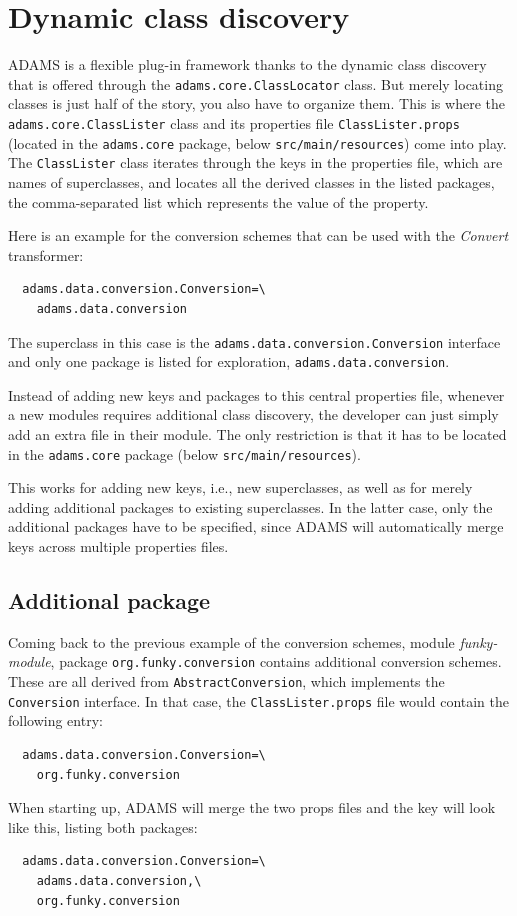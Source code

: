 \section{Dynamic class discovery}
\label{dynamic_class_discovery}
ADAMS is a flexible plug-in framework thanks to the dynamic class discovery that
is offered through the \texttt{adams.core.ClassLocator} class. But merely
locating classes is just half of the story, you also have to organize them. This
is where the \texttt{adams.core.ClassLister} class and its properties file
\texttt{ClassLister.props} (located in the \texttt{adams.core} package, below
\texttt{src/main/resources}) come into play. The \texttt{ClassLister} class
iterates through the keys in the properties file, which are names of
superclasses, and locates all the derived classes in the listed packages, the
comma-separated list which represents the value of the property.

Here is an example for the conversion schemes that can be used with the
\textit{Convert} transformer:
\begin{verbatim}
  adams.data.conversion.Conversion=\
    adams.data.conversion
\end{verbatim}
The superclass in this case is the
\texttt{adams.data.conversion.Conversion} interface and only one package is listed
for exploration, \texttt{adams.data.conversion}.

Instead of adding new keys and packages to this central properties file,
whenever a new modules requires additional class discovery, the developer can
just simply add an extra file in their module. The only restriction is that it
has to be located in the \texttt{adams.core} package (below
\texttt{src/main/resources}).

This works for adding new keys, i.e., new superclasses, as well as for merely
adding additional packages to existing superclasses. In the latter case, only
the additional packages have to be specified, since ADAMS will automatically
merge keys across multiple properties files.

\subsection{Additional package}
Coming back to the previous example of the conversion schemes, module
\textit{funky-module}, package \texttt{org.funky.conversion} contains
additional conversion schemes. These are all derived from
\texttt{AbstractConversion}, which implements the \texttt{Conversion} interface.
In that case, the \texttt{ClassLister.props} file would contain the following entry:
\begin{verbatim}
  adams.data.conversion.Conversion=\
    org.funky.conversion
\end{verbatim}
When starting up, ADAMS will merge the two props files and the key
will look like this, listing both packages:
\begin{verbatim}
  adams.data.conversion.Conversion=\
    adams.data.conversion,\
    org.funky.conversion
\end{verbatim}

